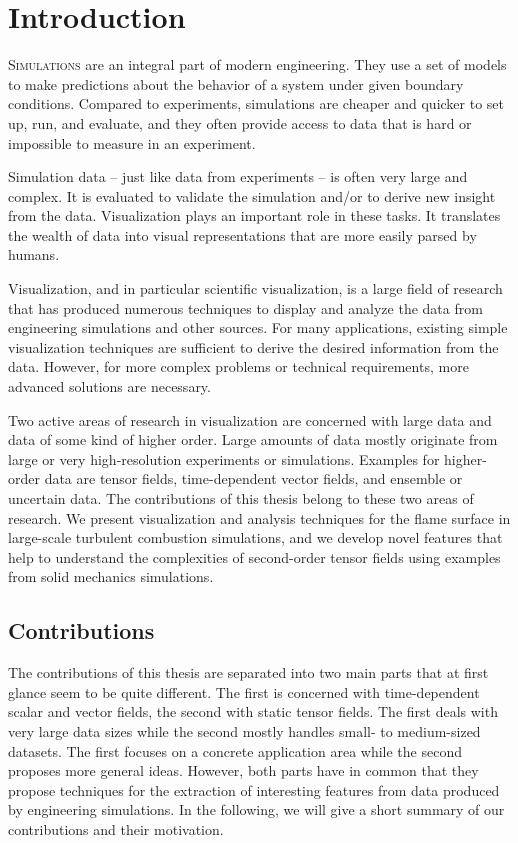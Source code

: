 
\chapter{Introduction} %
\label{cha:introduction}
%
\vspace{-\baselineskip}%
\lettrine[findent=-3.5pt, nindent=4pt, loversize=0.015,
lhang=0.08]{S}{imulations} are an integral part of modern engineering.
%
They use a set of models to make predictions about the behavior of a system
under given boundary conditions.
%
Compared to experiments, simulations are cheaper and quicker to set up, run, and
evaluate, and they often provide access to data that is hard or impossible to
measure in an experiment.
%

%
Simulation data -- just like data from experiments -- is often very large and
complex.
%
It is evaluated to validate the simulation and/or to derive new insight from
the data.
%
Visualization plays an important role in these tasks.
%
It translates the wealth of data into visual representations that are more
easily parsed by humans.
%

%
Visualization, and in particular scientific visualization, is a large field of
research that has produced numerous techniques to display and analyze the data
from engineering simulations and other sources.
%
For many applications, existing simple visualization techniques are sufficient
to derive the desired information from the data.
%
However, for more complex problems or technical requirements, more advanced
solutions are necessary.
%

%
Two active areas of research in visualization are concerned with large data and
data of some kind of higher order.
%
Large amounts of data mostly originate from large or very high-resolution
experiments or simulations.
%
Examples for higher-order data are tensor fields, time-dependent vector fields,
and ensemble or uncertain data.
%
The contributions of this thesis belong to these two areas of research.
%
We present visualization and analysis techniques for the flame surface in
large-scale turbulent combustion simulations, and we develop novel features
that help to understand the complexities of second-order tensor fields using
examples from solid mechanics simulations.
%
\section{Contributions} %
\label{sec:contributions}
%
The contributions of this thesis are separated into two main parts that at first
glance seem to be quite different.
%
The first is concerned with time-dependent scalar and vector fields, the second
with static tensor fields.
%
The first deals with very large data sizes while the second mostly handles
small- to medium-sized datasets.
%
The first focuses on a concrete application area while the second proposes more
general ideas.
%
However, both parts have in common that they propose techniques for the
extraction of interesting features from data produced by engineering
simulations.
%
In the following, we will give a short summary of our contributions and their
motivation.
%
